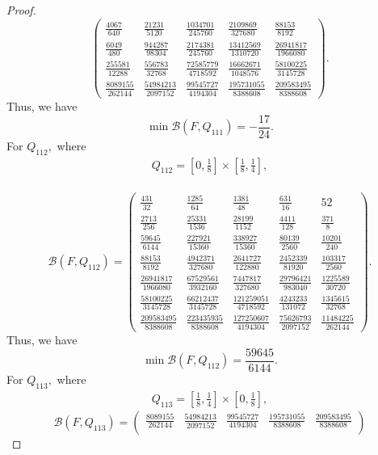 \documentclass[a4paper,12pt,reqno]{amsart} %
\numberwithin{equation}{section}
\theoremstyle{definition}
\begin{document}
\begin{proof}
\[\begin{pmatrix}
	\frac{4067}{640} & \frac{21231}{5120} & \frac{1034701}{245760} & \frac{2109869}{327680} & \frac{88153}{8192}\\[5mm]
	\frac{6049}{480} & \frac{944287}{98304} & \frac{2174381}{245760} & \frac{13412569}{1310720} & \frac{26941817}{1966080}\\[5mm]
	\frac{255581}{12288} & \frac{556783}{32768} & \frac{72585779}{4718592} & \frac{16662671}{1048576} & \frac{58100225}{3145728}\\[5mm]
	\frac{8089155}{262144} & \frac{54984213}{2097152} & \frac{99545727}{4194304} & \frac{195731055}{8388608} & \frac{209583495}{8388608}
\end{pmatrix}.
\]
Thus, we have
\[
\min \mathcal B(F,Q_{111})=-\frac{17}{24}.
\]
For $Q_{112},$ where
\begin{align*}
	Q_{112}=\left[0,\frac18\right]\times\left[\frac18,\frac14\right],
\end{align*}\\
\[
\mathcal B(F,Q_{112})=
\begin{pmatrix}
	\frac{431}{32} & \frac{1285}{64} & \frac{1381}{48} & \frac{631}{16} & 52\\[5mm]
	\frac{2713}{256} & \frac{25331}{1536} & \frac{28199}{1152} & \frac{4411}{128} & \frac{371}{8}\\[5mm]
	\frac{59645}{6144} & \frac{227921}{15360} & \frac{338927}{15360} & \frac{80139}{2560} & \frac{10201}{240}\\[5mm]
	\frac{88153}{8192} & \frac{4942371}{327680} & \frac{2641727}{122880} & \frac{2452339}{81920} & \frac{103317}{2560}\\[5mm]
	\frac{26941817}{1966080} & \frac{67529561}{3932160} & \frac{7447817}{327680} & \frac{29796421}{983040} & \frac{1225589}{30720}\\[5mm]
	\frac{58100225}{3145728} & \frac{66212437}{3145728} & \frac{121259051}{4718592} & \frac{4243233}{131072} & \frac{1345615}{32768}\\[5mm]
	\frac{209583495}{8388608} & \frac{223435935}{8388608} & \frac{127250607}{4194304} & \frac{75626793}{2097152} & \frac{11484225}{262144}
\end{pmatrix}.
\]
Thus, we have
\[
\min \mathcal B(F,Q_{112})=\frac{59645}{6144}.
\]
For $Q_{113},$ where
\begin{align*}
	Q_{113}=\left[\frac18,\frac14\right]\times\left[0,\frac18\right],
\end{align*}
\[
\mathcal B(F,Q_{113})=
\begin{pmatrix}
	\frac{8089155}{262144} & \frac{54984213}{2097152} & \frac{99545727}{4194304} & \frac{195731055}{8388608} & \frac{209583495}{8388608}\\[5mm]

\end{pmatrix}\]
\end{proof}
\end{document}
